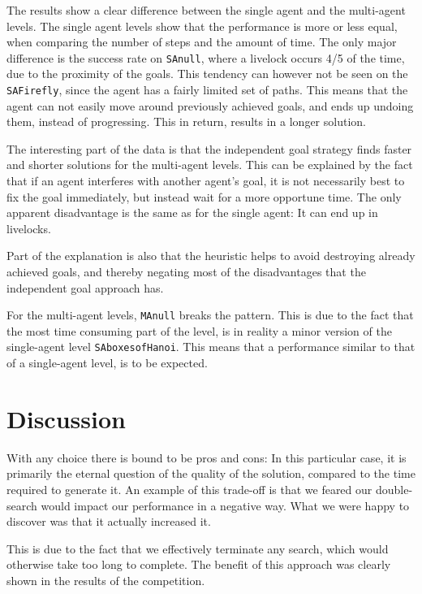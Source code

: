 \documentclass[letterpaper]{article}
\begin{document}
		The results show a clear difference between the single agent and the multi-agent levels. 
		The single agent levels show that the performance is more or less equal, when comparing the number of steps and the amount of time. The only major difference is the success rate on \verb=SAnull=, where a livelock occurs 4/5 of the time, due to the proximity of the goals. This tendency can however not be seen on the \verb|SAFirefly|, since the agent has a fairly limited set of paths. This means that the agent can not easily move around previously achieved goals, and ends up undoing them, instead of progressing. This in return, results in a longer solution.
		
		The interesting part of the data is that the independent goal strategy finds faster and shorter solutions for the multi-agent levels. This can be explained by the fact that if an agent interferes with another agent's goal, it is not necessarily best to fix the goal immediately, but instead wait for a more opportune time. The only apparent disadvantage is the same as for the single agent: It can end up in livelocks.
		
		Part of the explanation is also that the heuristic helps to avoid destroying already achieved goals, and thereby negating most of the disadvantages that the independent goal approach has. 
		
		For the multi-agent levels, \verb|MAnull| breaks the pattern. This is due to the fact that the most time consuming part of the level, is in reality a minor version of the single-agent level \verb=SAboxesofHanoi=. This means that a performance similar to that of a single-agent level, is to be expected. 
	
	
\section{Discussion}
	\label{disscussion}
	With any choice there is bound to be pros and cons: In this particular case, it is primarily the eternal question of the quality of the solution, compared to the time required to generate it. An example of this trade-off is that we feared our double-search would impact our performance in a negative way. What we were happy to discover was that it actually increased it. 

	This is due to the fact that we effectively terminate any search, which would otherwise take too long to complete. The benefit of this approach was clearly shown in the results of the competition.
\end{document}
